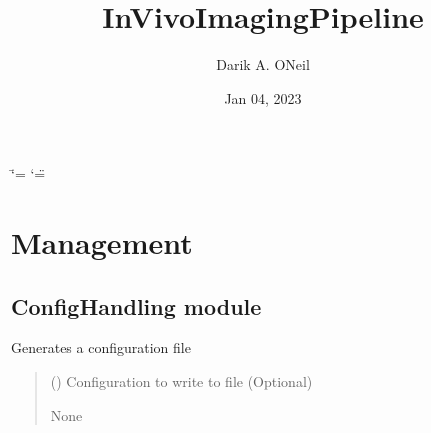 \documentclass[letterpaper,10pt,english]{sphinxmanual}
\title{In\sphinxhyphen{}Vivo\sphinxhyphen{}Imaging\sphinxhyphen{}Pipeline}
\date{Jan 04, 2023}
\author{Darik A.\@{} O\textquotesingle{}Neil}
\begin{document}
\ifdefined\shorthandoff
  \ifnum\catcode`\=\string=\active\shorthandoff{=}\fi
  \ifnum\catcode`\"=\active{}\fi
\fi

\pagestyle{empty}
\sphinxmaketitle
\pagestyle{plain}
\sphinxtableofcontents
\pagestyle{normal}
\label{\detokenize{index::doc}}


\sphinxstepscope


\chapter{Management}
\label{\detokenize{Management:management}}\label{\detokenize{Management::doc}}
\sphinxstepscope


\section{ConfigHandling module}
\label{\detokenize{ConfigHandling:module-ConfigHandling}}\label{\detokenize{ConfigHandling:confighandling-module}}\label{\detokenize{ConfigHandling::doc}}

\begin{fulllineitems}
\label{\detokenize{ConfigHandling:ConfigHandling.config_generator}}
\pysigstartsignatures
{}
\pysigstopsignatures
\sphinxAtStartPar
Generates a configuration file
\begin{quote}\begin{description}
\sphinxAtStartPar
{} () \textendash{} Configuration to write to file (Optional)

\sphinxAtStartPar
None

\end{description}\end{quote}

\end{fulllineitems}
\end{document}
